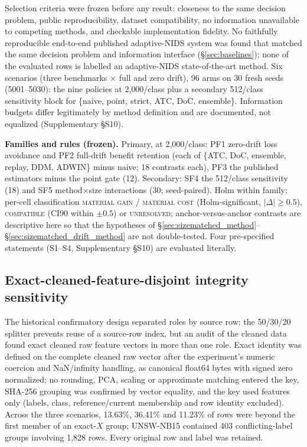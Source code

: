\documentclass[journal]{IEEEtran}
\begin{document}
Selection criteria were frozen before any result: closeness to the same decision problem, public reproducibility, dataset compatibility, no information unavailable to competing methods, and checkable implementation fidelity. No faithfully reproducible end-to-end published adaptive-NIDS system was found that matched the same decision problem and information interface (\S\ref{sec:baselines}); none of the evaluated rows is labelled an adaptive-NIDS state-of-the-art method. Six scenarios (three benchmarks $\times$ full and zero drift), 96 arms on 30 fresh seeds (5001--5030): the nine policies at 2{,}000/class plus a secondary 512/class sensitivity block for \{naive, point, strict, ATC, DoC, ensemble\}. Information budgets differ legitimately by method definition and are documented, not equalized (Supplementary \S S10).

\textbf{Families and rules (frozen).} Primary, at 2{,}000/class: PF1 zero-drift loss avoidance and PF2 full-drift benefit retention (each of \{ATC, DoC, ensemble, replay, DDM, ADWIN\} minus naive; 18 contrasts each), PF3 the published estimators minus the point gate (12). Secondary: SF4 the 512/class sensitivity (18) and SF5 method$\times$size interactions (30; seed-paired). Holm within family; per-cell classification \textsc{material gain} / \textsc{material cost} (Holm-significant, $|\Delta| \ge 0.5$), \textsc{compatible} (CI90 within $\pm0.5$) or \textsc{unresolved}; anchor-versus-anchor contrasts are descriptive here so that the hypotheses of \S\ref{sec:sizematched_method}--\S\ref{sec:sizematched_drift_method} are not double-tested. Four pre-specified statements (S1--S4, Supplementary \S S10) are evaluated literally.

\subsection{Exact-cleaned-feature-disjoint integrity sensitivity}
\label{sec:value_disjoint_method}

The historical confirmatory design separated roles by source row: the 50/30/20 splitter prevents reuse of a source-row index, but an audit of the cleaned data found exact cleaned raw feature vectors in more than one role. Exact identity was defined on the complete cleaned raw vector after the experiment's numeric coercion and NaN/infinity handling, as canonical float64 bytes with signed zero normalized; no rounding, PCA, scaling or approximate matching entered the key, SHA-256 grouping was confirmed by vector equality, and the key used features only (labels, class, reference/current membership and row identity excluded). Across the three scenarios, 13.63\%, 36.41\% and 11.23\% of rows were beyond the first member of an exact-$X$ group; UNSW-NB15 contained 403 conflicting-label groups involving 1{,}828 rows. Every original row and label was retained.
\end{document}
